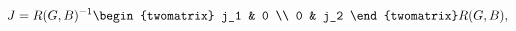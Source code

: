 \begin{equation}
\label{eq:Jdiag}
  J = R(G,B)^{-1} \begin{twomatrix}
                     j_1 &  0 \\
                      0  & j_2
                  \end{twomatrix}
      R(G,B),
\end{equation}

